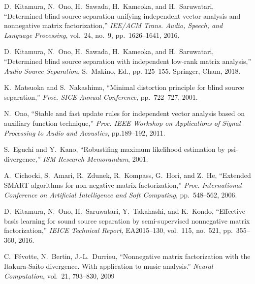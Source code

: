 \documentclass[honka]{nitkagawathesis}%
\begin{document}
\begin{thebibliography}{99}
  D.~Kitamura, N.~Ono, H.~Sawada, H.~Kameoka, and H.~Saruwatari,
  ``Determined blind source separation unifying independent vector analysis and nonnegative matrix factorization,'' 
  {\em IEE/ACM Trans. Audio, Speech, and Language Processing}, vol.~24, no.~9, pp.~1626--1641, 2016.

  D.~Kitamura, N.~Ono, H.~Sawada, H.~Kameoka, and H.~Saruwatari, ``Determined blind source separation with independent low-rank matrix analysis,'' 
  {\em Audio Source Separation}, S.~Makino, Ed., pp. 125--155. Springer, Cham, 2018.

  K.~Matsuoka and S.~Nakashima,
  ``Minimal distortion principle for blind source separation,''
  {\em Proc. SICE Annual Conference}, pp.~722--727, 2001.
  
  N.~Ono,
  ``Stable and fast update rules for independent vector analysis based on auxiliary function technique,''
  {\em Proc. IEEE Workshop on Applications of Signal Processing to Audio and Acoustics}, pp.189--192, 2011.
  
  
  S.~Eguchi and Y.~Kano, 
  ``Robustifing maximum likelihood estimation by psi- divergence,'' 
  {\em ISM Research Memorandum}, 2001.
  
  A.~Cichocki, S.~Amari, R.~Zdunek, R.~Kompass, G.~Hori, and Z.~He, 
  ``Extended SMART algorithms for non-negative matrix factorization,'' 
  {\em Proc. International Conference on Artificial Intelligence and Soft Computing}, pp.~548--562, 2006.
  
  D.~Kitamura, N.~Ono, H.~Saruwatari, Y.~Takahashi, and K.~Kondo, 
  ``Effective basis learning for sound source separation by semi-supervised nonnegative matrix factorization,'' 
  {\em IEICE Technical Report}, EA2015--130, vol.~115, no.~521, pp.~355--360, 2016.

  C.~Févotte, N.~Bertin, J.-L.~Durrieu, 
  ``Nonnegative matrix factorization with the Itakura-Saito divergence. With application to music analysis.'' 
  {\em Neural Computation}, vol.~21, 793--830, 2009
  

\end{thebibliography}
\end{document}
